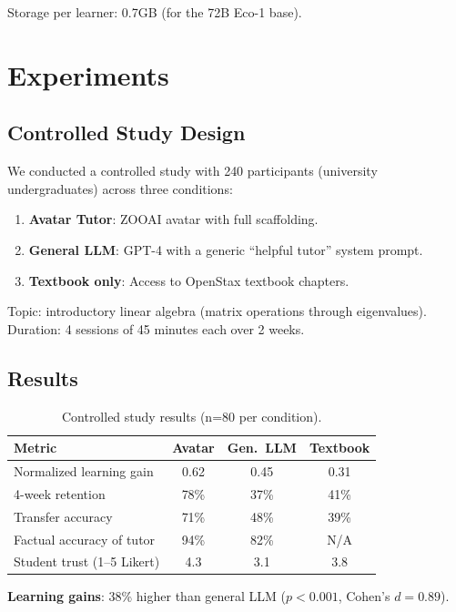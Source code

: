 \documentclass[11pt,letterpaper]{article}
\begin{document}
Storage per learner: 0.7GB (for the 72B Eco-1 base).

\section{Experiments}

\subsection{Controlled Study Design}

We conducted a controlled study with 240 participants (university undergraduates) across three conditions:

\begin{enumerate}
    \item \textbf{Avatar Tutor}: ZOOAI avatar with full scaffolding.
    \item \textbf{General LLM}: GPT-4 with a generic ``helpful tutor'' system prompt.
    \item \textbf{Textbook only}: Access to OpenStax textbook chapters.
\end{enumerate}

Topic: introductory linear algebra (matrix operations through eigenvalues). Duration: 4 sessions of 45 minutes each over 2 weeks.

\subsection{Results}

\begin{table}[t]
\centering
\begin{tabular}{lccc}
\toprule
\textbf{Metric} & \textbf{Avatar} & \textbf{Gen.\ LLM} & \textbf{Textbook} \\
\midrule
Normalized learning gain & 0.62 & 0.45 & 0.31 \\
4-week retention & 78\% & 37\% & 41\% \\
Transfer accuracy & 71\% & 48\% & 39\% \\
Factual accuracy of tutor & 94\% & 82\% & N/A \\
Student trust (1--5 Likert) & 4.3 & 3.1 & 3.8 \\
\bottomrule
\end{tabular}
\caption{Controlled study results (n=80 per condition).}
\label{tab:results}
\end{table}

\textbf{Learning gains}: 38\% higher than general LLM ($p < 0.001$, Cohen's $d = 0.89$).
\end{document}
